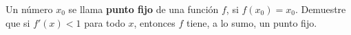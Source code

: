 \item Un número $x_0$ se llama \textbf{punto fijo} de una función $f$, si $f(x_0) = x_0$. Demuestre que si $f'(x) < 1$ para todo $x$, entonces $f$ tiene, a lo sumo, un punto fijo.
